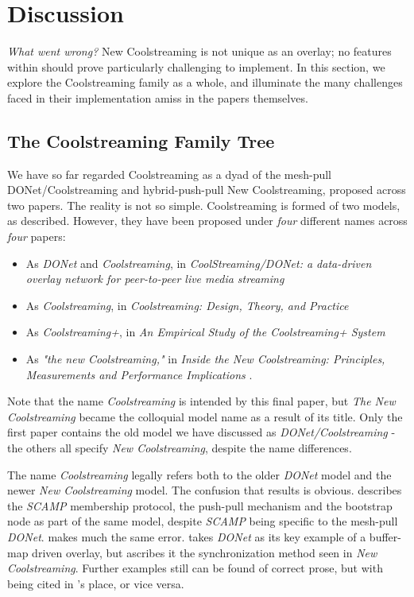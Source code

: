 \documentclass[12pt,a4paper]{article}
\begin{document}
\section{Discussion} \label{problems}
\textit{What went wrong?} New Coolstreaming is not unique as an overlay; no features within should prove particularly challenging to implement. In this section, we explore the Coolstreaming family as a whole, and illuminate the many challenges faced in their implementation amiss in the papers themselves.

\subsection{The Coolstreaming Family Tree} \label{problems:familytree}
We have so far regarded Coolstreaming as a dyad of the mesh-pull DONet/Coolstreaming and hybrid-push-pull New Coolstreaming, proposed across two papers. The reality is not so simple. Coolstreaming is formed of two models, as described. However, they have been proposed under \textit{four} different names across \textit{four} papers:

\begin{itemize}
	\item As \textit{DONet} and \textit{Coolstreaming}, in \textit{CoolStreaming/DONet: a data-driven overlay network for peer-to-peer live media streaming} \cite{Zhang2005}
	\item As \textit{Coolstreaming}, in \textit{Coolstreaming: Design, Theory, and Practice} \cite{Xie2007}
	\item As \textit{Coolstreaming+}, in \textit{An Empirical Study of the Coolstreaming+ System} \cite{Li2007}
	\item As \textit{"the new Coolstreaming,"} in \textit{Inside the New Coolstreaming: Principles, Measurements and Performance Implications} \cite{Li2008}.
\end{itemize}

Note that the name \textit{Coolstreaming} is intended by this final paper, but \textit{The New Coolstreaming} became the colloquial model name as a result of its title. Only the first paper contains the old model we have discussed as \textit{DONet/Coolstreaming} - the others all specify \textit{New Coolstreaming}, despite the name differences.

The name \textit{Coolstreaming} legally refers both to the older \textit{DONet} model and the newer \textit{New Coolstreaming} model. The confusion that results is obvious. \cite{Kondo2014} describes the \textit{SCAMP} membership protocol, the push-pull mechanism and the bootstrap node as part of the same model, despite \textit{SCAMP} being specific to the mesh-pull \textit{DONet}. \cite{Beraldi2010} makes much the same error. \cite{Lan2011} takes \textit{DONet} as its key example of a buffer-map driven overlay, but ascribes it the synchronization method seen in \textit{New Coolstreaming}. Further examples still can be found of correct prose, but with \cite{Xie2007} being cited in \cite{Zhang2005}'s place, or vice versa.
\end{document}
